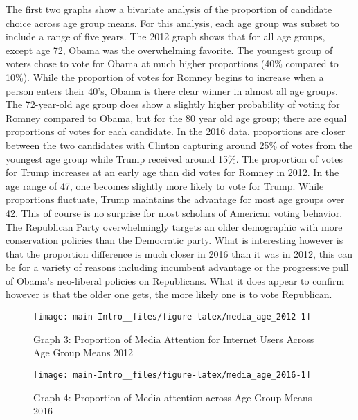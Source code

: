 \documentclass[11pt,]{article}
\begin{document}
The first two graphs show a bivariate analysis of the proportion of
candidate choice across age group means. For this analysis, each age
group was subset to include a range of five years. The 2012 graph shows
that for all age groups, except age 72, Obama was the overwhelming
favorite. The youngest group of voters chose to vote for Obama at much
higher proportions (40\% compared to 10\%). While the proportion of
votes for Romney begins to increase when a person enters their 40's,
Obama is there clear winner in almost all age groups. The 72-year-old
age group does show a slightly higher probability of voting for Romney
compared to Obama, but for the 80 year old age group; there are equal
proportions of votes for each candidate. In the 2016 data, proportions
are closer between the two candidates with Clinton capturing around 25\%
of votes from the youngest age group while Trump received around 15\%.
The proportion of votes for Trump increases at an early age than did
votes for Romney in 2012. In the age range of 47, one becomes slightly
more likely to vote for Trump. While proportions fluctuate, Trump
maintains the advantage for most age groups over 42. This of course is
no surprise for most scholars of American voting behavior. The
Republican Party overwhelmingly targets an older demographic with more
conservation policies than the Democratic party. What is interesting
however is that the proportion difference is much closer in 2016 than it
was in 2012, this can be for a variety of reasons including incumbent
advantage or the progressive pull of Obama's neo-liberal policies on
Republicans. What it does appear to confirm however is that the older
one gets, the more likely one is to vote Republican.

\begin{figure}

{\centering \texttt{[image: main-Intro\_\_files/figure-latex/media\_age\_2012-1]} 

}

\caption{Graph 3: Proportion of Media Attention for Internet Users Across Age Group Means 2012}\label{fig:media_age_2012}
\end{figure}

\begin{figure}

{\centering \texttt{[image: main-Intro\_\_files/figure-latex/media\_age\_2016-1]} 

}

\caption{Graph 4: Proportion of Media attention across Age Group Means 2016}\label{fig:media_age_2016}
\end{figure}
\end{document}
